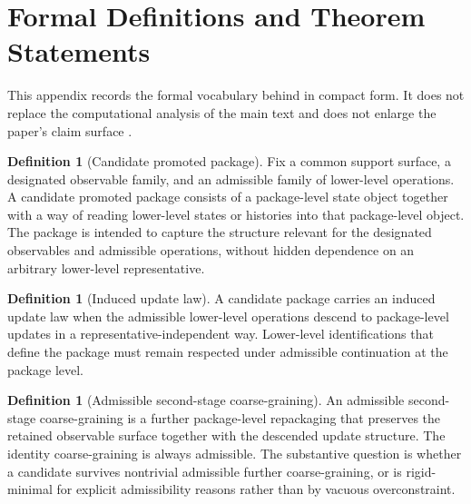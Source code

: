 \documentclass[11pt]{article}
\theoremstyle{definition}
\newtheorem{definition}[theorem]{Definition}
\begin{document}
\appendix
\section{Formal Definitions and Theorem Statements}\label{app:formal}

This appendix records the formal vocabulary behind  in compact form. It does not replace the computational analysis of the main text and does not enlarge the paper's claim surface \citep{Nerode1958,Park1981,KemenySnell1960,RogersPitman1981,Fisher1922,Blackwell1953,CousotCousot1977}.

\begin{definition}[Candidate promoted package]
Fix a common support surface, a designated observable family, and an admissible family of lower-level operations. A candidate promoted package consists of a package-level state object together with a way of reading lower-level states or histories into that package-level object. The package is intended to capture the structure relevant for the designated observables and admissible operations, without hidden dependence on an arbitrary lower-level representative.
\end{definition}

\begin{definition}[Induced update law]
A candidate package carries an induced update law when the admissible lower-level operations descend to package-level updates in a representative-independent way. Lower-level identifications that define the package must remain respected under admissible continuation at the package level.
\end{definition}

\begin{definition}[Admissible second-stage coarse-graining]
An admissible second-stage coarse-graining is a further package-level repackaging that preserves the retained observable surface together with the descended update structure. The identity coarse-graining is always admissible. The substantive question is whether a candidate survives nontrivial admissible further coarse-graining, or is rigid-minimal for explicit admissibility reasons rather than by vacuous overconstraint.
\end{definition}
\end{document}
